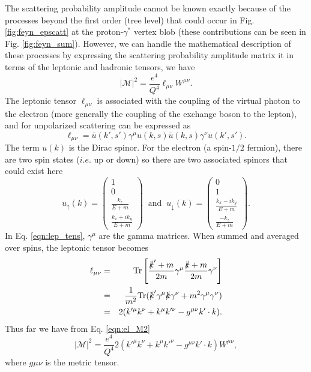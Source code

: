 The scattering probability amplitude cannot be known exactly because of the processes beyond the first order (tree level) that could occur in Fig. \ref{fig:feyn_epscatt} at the proton-$\gamma^{*}$ vertex blob (these contributions can be seen in Fig. \ref{fig:feyn_sum}). However, we can handle the mathematical description of these processes by expressing the scattering probability amplitude matrix it in terms of the leptonic and hadronic tensors, we have
\begin{equation}
\label{eqn:el_M2}
|\mathcal{M}|^2 = \frac{e^4}{Q^4} \ell_{\mu\nu} W^{\mu \nu}.
\end{equation}
The leptonic tensor $\ell_{\mu\nu}$ is associated with the coupling of the virtual photon to the electron (more generally the coupling of the exchange boson to the lepton), and for unpolarized scattering can be expressed as
\begin{equation}
\label{eqn:lep_tens}
\ell_{\mu\nu} = \bar{u}(k',s')\gamma^{\mu}u(k,s) \bar{u}(k,s) \gamma^{\nu} u(k',s').
\end{equation}
The term $u(k)$ is the Dirac spinor. For the electron (a spin-$1/2$ fermion), there are two spin states ($i.e.$ up or down) so there are two associated spinors that could exist here
\begin{equation}
u_{\uparrow}(k) = \left( \begin{array}{c} 1 \\ 0 \\ \frac{k_z}{E+m} \\ \frac{k_x+ik_y}{E+m} \end{array} \right) \; \; \mathrm{and} \; \;
u_{\downarrow}(k) = \left( \begin{array}{c} 0 \\ 1 \\ \frac{k_x-ik_y}{E+m} \\ \frac{-k_z}{E+m} \end{array} \right).
\end{equation}
In Eq. \ref{eqn:lep_tens}, $\gamma^{\mu}$ are the gamma matrices. When summed and averaged over spins, the leptonic tensor becomes
\begin{eqnarray}
\nonumber
\ell_{\mu\nu} &=& \mathrm{Tr} \left[ \frac{\slashed{k}'+m}{2m} \gamma^{\mu} \frac{\slashed{k}+m}{2m} \gamma^{\nu} \right] \\
\nonumber
&=& \frac{1}{m^2} \mathrm{Tr} (\slashed{k}'\gamma^{\mu}\slashed{k}\gamma^{\nu} + m^2\gamma^{\mu}\gamma^{\nu}) \\
&=& 2 (k'^{\mu}k^{\nu} + k^{\mu}k'^{\nu} - g^{\mu\nu}k' \cdot k).
\end{eqnarray}
Thus far we have from Eq. \ref{eqn:el_M2}
\begin{equation}
|\mathcal{M}|^2 = \frac{e^4}{Q^4} 2 (k'^{\mu}k^{\nu} + k^{\mu}k'^{\nu} - g^{\mu\nu}k' \cdot k) W^{\mu \nu},
\end{equation}
where $g{\mu\nu}$ is the metric tensor.

